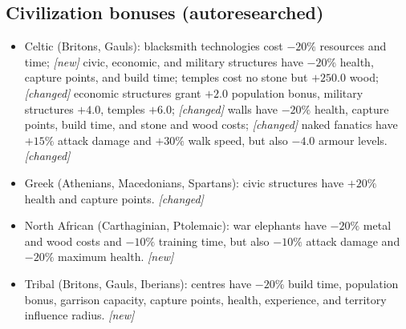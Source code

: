 \documentclass{article}
\begin{document}
\subsection{Civilization bonuses (autoresearched)}
\begin{itemize}
  \item Celtic (Britons, Gauls):
  \subitem blacksmith technologies cost $-20\%$ resources and time; \emph{[new]}
  \subitem civic, economic, and military structures have $-20\%$ health, capture points, and build time; temples cost no stone but $+250.0$ wood; \emph{[changed]}
  \subitem economic structures grant $+2.0$ population bonus, military structures $+4.0$, temples $+6.0$; \emph{[changed]}
  \subitem walls have $-20\%$ health, capture points, build time, and stone and wood costs; \emph{[changed]}
  \subitem naked fanatics have $+15\%$ attack damage and $+30\%$ walk speed, but also $-4.0$ armour levels. \emph{[changed]}
  \item Greek (Athenians, Macedonians, Spartans):
  \subitem civic structures have $+20\%$ health and capture points. \emph{[changed]}
  \item North African (Carthaginian, Ptolemaic):
  \subitem war elephants have $-20\%$ metal and wood costs and $-10\%$ training time, but also $-10\%$ attack damage and $-20\%$ maximum health. \emph{[new]}
  \item Tribal (Britons, Gauls, Iberians):
  \subitem centres have $-20\%$ build time, population bonus, garrison capacity, capture points, health, experience, and territory influence radius. \emph{[new]}


\end{itemize}
\end{document}
